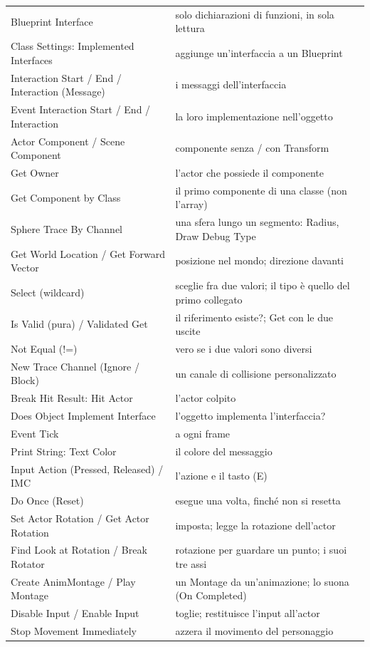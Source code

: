 \begin{table}[htbp]
\begin{tabular}{@{}p{5.8cm}p{8.2cm}@{}}
Blueprint Interface & solo dichiarazioni di funzioni, in sola lettura \\
Class Settings: Implemented Interfaces & aggiunge un'interfaccia a un Blueprint \\
Interaction Start / End / Interaction (Message) & i messaggi dell'interfaccia \\
Event Interaction Start / End / Interaction & la loro implementazione nell'oggetto \\
Actor Component / Scene Component & componente senza / con Transform \\
Get Owner & l'actor che possiede il componente \\
Get Component by Class & il primo componente di una classe (non l'array) \\
Sphere Trace By Channel & una sfera lungo un segmento: Radius, Draw Debug Type \\
Get World Location / Get Forward Vector & posizione nel mondo; direzione davanti \\
Select (wildcard) & sceglie fra due valori; il tipo è quello del primo collegato \\
Is Valid (pura) / Validated Get & il riferimento esiste?; Get con le due uscite \\
Not Equal (!=) & vero se i due valori sono diversi \\
New Trace Channel (Ignore / Block) & un canale di collisione personalizzato \\
Break Hit Result: Hit Actor & l'actor colpito \\
Does Object Implement Interface & l'oggetto implementa l'interfaccia? \\
Event Tick & a ogni frame \\
Print String: Text Color & il colore del messaggio \\
Input Action (Pressed, Released) / IMC & l'azione e il tasto (E) \\
Do Once (Reset) & esegue una volta, finché non si resetta \\
Set Actor Rotation / Get Actor Rotation & imposta; legge la rotazione dell'actor \\
Find Look at Rotation / Break Rotator & rotazione per guardare un punto; i suoi tre assi \\
Create AnimMontage / Play Montage & un Montage da un'animazione; lo suona (On Completed) \\
Disable Input / Enable Input & toglie; restituisce l'input all'actor \\
Stop Movement Immediately & azzera il movimento del personaggio \\

\end{tabular}
\end{table}

